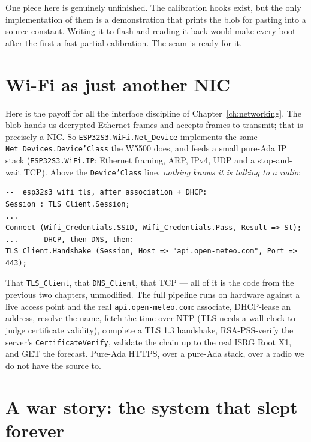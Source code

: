 One piece here is genuinely unfinished. The calibration hooks exist, but the only
implementation of them is a demonstration that prints the blob for pasting into a
source constant. Writing it to flash and reading it back would make every boot
after the first a fast partial calibration. The seam is ready for it.

\section{Wi-Fi as just another NIC}
\label{ch:wifi:netdevice}

Here is the payoff for all the interface discipline of
Chapter~\ref{ch:networking}. The blob hands us decrypted Ethernet frames and
accepts frames to transmit; that is precisely a NIC. So
\texttt{ESP32S3.WiFi.Net\_Device} implements the same
\texttt{Net\_Devices.Device'Class} the W5500 does, and feeds a small pure-Ada IP
stack (\texttt{ESP32S3.WiFi.IP}: Ethernet framing, ARP, IPv4, UDP and a
stop-and-wait TCP). Above the \texttt{Device'Class} line, \emph{nothing knows it
is talking to a radio}:

\begin{lstlisting}
--  esp32s3_wifi_tls, after association + DHCP:
Session : TLS_Client.Session;
...
Connect (Wifi_Credentials.SSID, Wifi_Credentials.Pass, Result => St);
...  --  DHCP, then DNS, then:
TLS_Client.Handshake (Session, Host => "api.open-meteo.com", Port => 443);
\end{lstlisting}

That \texttt{TLS\_Client}, that \texttt{DNS\_Client}, that TCP --- all of it is
the code from the previous two chapters, unmodified. The full pipeline runs on
hardware against a live access point and the real \texttt{api.open-meteo.com}:
associate, DHCP-lease an address, resolve the name, fetch the time over NTP (TLS
needs a wall clock to judge certificate validity), complete a TLS 1.3 handshake,
RSA-PSS-verify the server's \texttt{CertificateVerify}, validate the chain up to
the real ISRG Root X1, and GET the forecast. Pure-Ada HTTPS, over a pure-Ada
stack, over a radio we do not have the source to.

\section{A war story: the system that slept forever}
\label{ch:wifi:deadlock}

